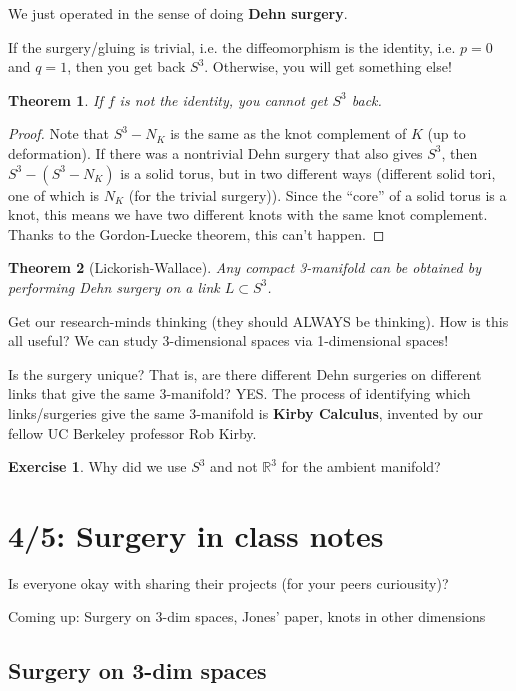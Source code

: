 \documentclass[11pt]{article}
\newcommand{\R}{\mathbb{R}}
\theoremstyle{plain}
\newtheorem{thm}{Theorem}
\theoremstyle{definition}
\newtheorem{exercise}{Exercise}
\begin{document}
\bigskip
We just operated in the sense of doing \textbf{Dehn surgery}.

\bigskip
If the surgery/gluing is trivial, i.e. the diffeomorphism is the identity, i.e. $p=0$ and $q=1$, then you get back $S^3$. Otherwise, you will get something else!

\begin{thm}
If $f$ is not the identity, you cannot get $S^3$ back.
\end{thm}
\begin{proof}
Note that $S^3-N_K$ is the same as the knot complement of $K$ (up to deformation). If there was a nontrivial Dehn surgery that also gives $S^3$, then $S^3-(S^3-N_K)$ is a solid torus, but in two different ways (different solid tori, one of which is $N_K$ (for the trivial surgery)). Since the ``core'' of a solid torus is a knot, this means we have two different knots with the same knot complement. Thanks to the Gordon-Luecke theorem, this can't happen.
\end{proof}

\begin{thm}[Lickorish-Wallace]
Any compact 3-manifold can be obtained by performing Dehn surgery on a link $L\subset S^3$.
\end{thm}

Get our research-minds thinking (they should ALWAYS be thinking). How is this all useful? We can study 3-dimensional spaces via 1-dimensional spaces!

Is the surgery unique? That is, are there different Dehn surgeries on different links that give the same 3-manifold? YES. The process of identifying which links/surgeries give the same 3-manifold is \textbf{Kirby Calculus}, invented by our fellow UC Berkeley professor Rob Kirby.

\begin{exercise}
Why did we use $S^3$ and not $\R^3$ for the ambient manifold?
\end{exercise}



\section{4/5: Surgery in class notes}

Is everyone okay with sharing their projects (for your peers curiousity)?

Coming up: Surgery on 3-dim spaces, Jones' paper, knots in other dimensions

\subsection{Surgery on 3-dim spaces}
\end{document}
